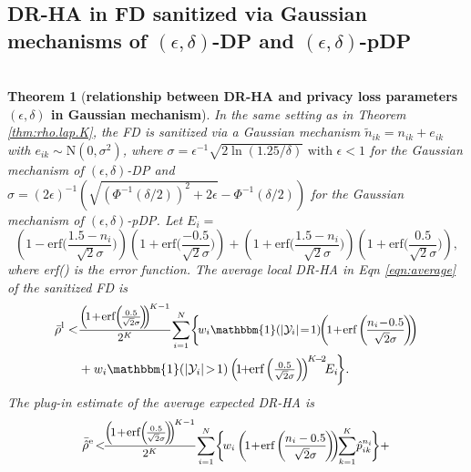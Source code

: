 \documentclass[10pt,journal,compsoc]{IEEEtran}
\newtheorem{thm}{\vspace{-6pt}\\ Theorem}
\begin{document}
\subsection{DR-HA in FD sanitized via Gaussian mechanisms of \texorpdfstring{$(\epsilon,\delta)$}{}-DP and \texorpdfstring{$(\epsilon,\delta)$}{}-pDP}\label{sec:gaussain} \vspace{-9pt}
\begin{thm}[\textbf{relationship between DR-HA and privacy loss parameters $(\epsilon,\delta)$ in Gaussian mechanism}]\label{thm:rho.gau.K}
In the same setting as in Theorem \ref{thm:rho.lap.K}, the FD is sanitized via a Gaussian mechanism $\tilde{n}_{ik}\!=\!n_{ik}\!+\!e_{ik}$ with $e_{ik}\!\sim\!\mbox{N}(0,\sigma^2)$, where
$\sigma=\epsilon^{-1}\sqrt{2\ln{(1.25/\delta)}}\mbox{ with $\epsilon<1$}$
for the Gaussian mechanism of $(\epsilon,\delta)$-DP and 
$\sigma=(2\epsilon)^{-1}(\sqrt{(\Phi^{-1}(\delta/2))^2+2\epsilon }-\Phi^{-1}(\delta/2))$
for the Gaussian mechanism of $(\epsilon,\delta)$-pDP. Let $E_i=$\vspace{-6pt}
$$\textstyle \!\!\left(\!1\!-\!\mbox{erf}\big(\!\frac{1.5\!-\!n_i}{\sqrt{2}\sigma}\!\big)\!\right)\!\!\left(\!1\!+\!
\mbox{erf}\big(\frac{-0.5}{\sqrt{2}\sigma}\!\big)\!\right)\!+\!
\left(\!1\!+\!\mbox{erf}\big(\frac{1.5\!-\!n_i}{\sqrt{2}\sigma}\big)\!\right)\!\left(\!1\!+\!\mbox{erf}\big(\frac{0.5}{\sqrt{2}\sigma}\big)\!\right)\!,$$
\normalsize where erf() is the error function. The average local DR-HA  in Eqn \eqref{eqn:average} of the sanitized FD is \vspace{-4pt}
\begin{align}
\bar{\rho}^{\text{l}}<&\mbox{\small$\displaystyle\frac{\left(\!1\!+\!\mbox{erf}\!\left(\!\frac{0.5}{\sqrt{2}\sigma}\!\right)\!\!\right)^{\!K-1}}{2^K}\!\sum_{i=1}^N\!\bigg\{\!w_i
\mathbbm{1}(|\mathcal{Y}_i|\!=\!1)\!\!\left(\!1\!+\!\mbox{erf}\left(\!\frac{n_i\!-\!0.5}{\sqrt{2}\sigma}\!\right)\!\!\right)$}\notag\\
&+\textstyle w_i\mathbbm{1}(|\mathcal{Y}_i|\!>\!1)\left(\!1\!\!+\!\!\mbox{erf}\left(\frac{0.5}{\sqrt{2}\sigma}\right)\!\right)^{\!K\!-\!2}\!\!E_i\!\bigg\}.\label{eqn:local.Gau}
\end{align}
The plug-in estimate of the average expected DR-HA is\vspace{-3pt}
\begin{align} 
\!\bar{\hat{\rho}}^{\text{e}}\!<&\mbox{\small$\displaystyle
\!\frac{\left(\!1\!+\!\mbox{erf}\!\left(\!\frac{0.5}{\sqrt{2}\sigma}\!\right)\!\!\right)^{\!K-1}}{2^K}
\!\sum_{i=1}^N\!\bigg\{\!w_i\left(\!1\!+\!\mbox{erf}\left(\!\frac{n_i-0.5}{\sqrt{2}\sigma}\!\right)\!\!\right)\!\!\sum_{k=1}^{K}\!\hat{p}_{ik}^{n_i}\!\bigg\}+$}\notag\\

\end{align}
\end{thm}
\end{document}
